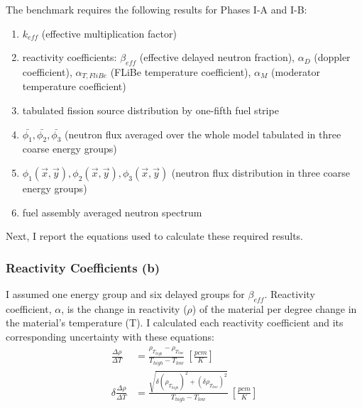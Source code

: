 The benchmark requires the following results for Phases I-A and I-B:
\begin{enumerate}[label=(\alph*)]
    \item $k_{eff}$ (effective multiplication factor)
    \item reactivity coefficients: $\beta_{eff}$ (effective delayed neutron fraction), 
    $\alpha_D$ (doppler coefficient), $\alpha_{T, FliBe}$ (\gls{FLiBe} temperature 
    coefficient), $\alpha_{M}$ (moderator temperature coefficient)
    \item tabulated fission source distribution by one-fifth fuel stripe
    \item $\bar{\phi_1}, \bar{\phi_2}, \bar{\phi_3}$ (neutron flux averaged over 
    the whole model tabulated in three coarse energy groups)
    \item $\phi_1(\vec{x},\vec{y}), \phi_2(\vec{x},\vec{y}), \phi_3(\vec{x},\vec{y})$ 
    (neutron flux distribution in three coarse energy groups) 
    \item fuel assembly averaged neutron spectrum
\end{enumerate}
Next, I report the equations used to calculate these required results.  

\subsubsection{Reactivity Coefficients (b)}
I assumed one energy group and six delayed groups for $\beta_{eff}$. 
Reactivity coefficient, $\alpha$, is the change in reactivity ($\rho$) of the 
material per degree change in the material's temperature (T). 
I calculated each reactivity coefficient and its corresponding uncertainty 
with these equations: 
\begin{align}
    \label{eq:reactivity-coefficient}
    \frac{\Delta \rho}{\Delta T} &= 
    \frac{\rho_{T_{high}}-\rho_{T_{low}}}{T_{high}-T_{low}} \ [\frac{pcm}{K}] \\
    \delta \frac{\Delta \rho}{\Delta T} &= 
    \frac{\sqrt{\delta (\rho_{T_{high}})^2+(\delta \rho_{T_{low}})^2}}{T_{high}-T_{low}} \ [\frac{pcm}{K}] 
\end{align}

